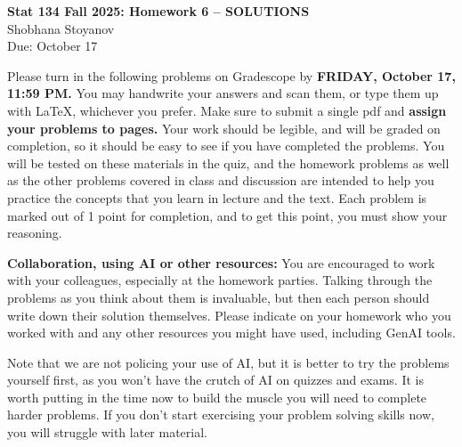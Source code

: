 \documentclass{article}
\begin{document}
\begin{center}
    \textbf{\large Stat 134 Fall 2025: Homework 6 -- SOLUTIONS} \\[6pt]
    Shobhana Stoyanov \\[6pt]
    \small Due: October 17
\end{center}

\vspace{1em}

Please turn in the following problems on Gradescope by \textbf{FRIDAY, October 17, 11:59 PM.}
You may handwrite your answers and scan them, or type them up with \LaTeX, whichever you prefer.
Make sure to submit a single pdf and \textbf{assign your problems to pages.}
Your work should be legible, and will be graded on completion, so it should be easy to see if you have completed the problems.
You will be tested on these materials in the quiz, and the homework problems as well as the other problems covered in class and discussion are intended to help you practice the concepts that you learn in lecture and the text.
Each problem is marked out of 1 point for completion, and to get this point, you must show your reasoning.

\bigskip
\noindent
\textbf{Collaboration, using AI or other resources:}
You are encouraged to work with your colleagues, especially at the homework parties. Talking through the problems as you think about them is invaluable, but then each person should write down their solution themselves.
Please indicate on your homework who you worked with and any other resources you might have used, including GenAI tools.

\medskip
\noindent
Note that we are not policing your use of AI, but it is better to try the problems yourself first, as you won’t have the crutch of AI on quizzes and exams.
It is worth putting in the time now to build the muscle you will need to complete harder problems.
If you don’t start exercising your problem solving skills now, you will struggle with later material.

\bigskip
\end{document}
